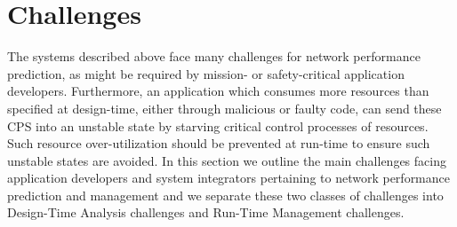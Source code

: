 \section{Challenges}
\label{sec:challenges}
The systems described above face many challenges for network performance prediction, as might be required by mission- or safety-critical application developers.  Furthermore, an application which consumes more resources than specified at design-time, either through malicious or faulty code, can send these CPS into an unstable state by starving critical control processes of resources.  Such resource over-utilization should be prevented at run-time to ensure such unstable states are avoided.  In this section we outline the main challenges facing application developers and system integrators pertaining to network performance prediction and management and we separate these two classes of challenges into Design-Time Analysis challenges and Run-Time Management challenges.  

\iffalse
\begin{itemize}
	\item System time-varying network resource model is very precise, can be difficult to derive; many systems are not as deterministic or periodic as this type of modeling requires
	\item The application and system network resource profiles require precise specification, which can be difficult to provide
	\item many types of applications cannot be easily modeled with this type of precise, periodic, deterministic paradigm (esp. data-dependent application network traffic)
	\item run-time systems require time synchronization
	\item system infrastructural network traffic is not modeled; simply removed from the system capabilities; not all types of infrastructural traffic is constant or predictable enough for this to be accurate
\end{itemize}
\fi

